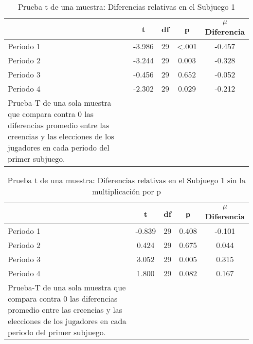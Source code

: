 \begin{table}[h]
\caption[Prueba t de una muestra: Diferencias relativas en el Subjuego 1]{Prueba t de una muestra: Diferencias relativas en el Subjuego 1}
\label{DN-S1}
\centering
\begin{tabular}{l | c c c | c}
\toprule
\textbf{} & \textbf{t} & \textbf{df} & \textbf{p} & \textbf{$\mu$Diferencia}\\
\midrule
Periodo 1 & -3.986 & 29 & <.001 & -0.457\\
Periodo 2 & -3.244 & 29 & 0.003 & -0.328\\
Periodo 3 & -0.456 & 29 & 0.652 & -0.052\\
Periodo 4 & -2.302 & 29 & 0.029 & -0.212\\
\bottomrule
Prueba-T de una sola muestra que compara contra 0 las diferencias promedio entre las creencias y las elecciones de los jugadores en cada periodo del primer subjuego.
\end{tabular}
\end{table}










\begin{table}[h]
\caption[Prueba t de una muestra: Diferencias relativas en el Subjuego 1 sin la multiplicación por p]{Prueba t de una muestra: Diferencias relativas en el Subjuego 1 sin la multiplicación por p}
\label{DN-S1}
\centering
\begin{tabular}{l | c c c | c}
\toprule
\textbf{} & \textbf{t} & \textbf{df} & \textbf{p} & \textbf{$\mu$Diferencia}\\
\midrule
Periodo 1 & -0.839 & 29 & 0.408 & -0.101\\
Periodo 2 & 0.424 & 29 & 0.675 & 0.044\\
Periodo 3 & 3.052 & 29 & 0.005 & 0.315\\
Periodo 4 & 1.800 & 29 & 0.082 & 0.167\\
\bottomrule
Prueba-T de una sola muestra que compara contra 0 las diferencias promedio entre las creencias y las elecciones de los jugadores en cada periodo del primer subjuego.
\end{tabular}
\end{table}









